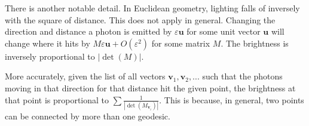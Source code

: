 \documentclass[12pt]{amsart}
\begin{document}
There is another notable detail. In Euclidean geometry, lighting falls of inversely with the square of distance. This does not apply in general. Changing the direction and distance a photon is emitted by $\varepsilon\textbf{u}$ for some unit vector $\textbf{u}$ will change where it hits by $M\varepsilon\textbf{u} + O(\varepsilon^2)$ for some matrix $M$. The brightness is inversely proportional to $|\det(M)|$.

More accurately, given the list of all vectors $\textbf{v}_1, \textbf{v}_2, ...$ such that the photons moving in that direction for that distance hit the given point, the brightness at that point is proportional to $\sum\frac{1}{|\det(M_{\textbf{v}_i})|}$. This is because, in general, two points can be connected by more than one geodesic.
\end{document}
